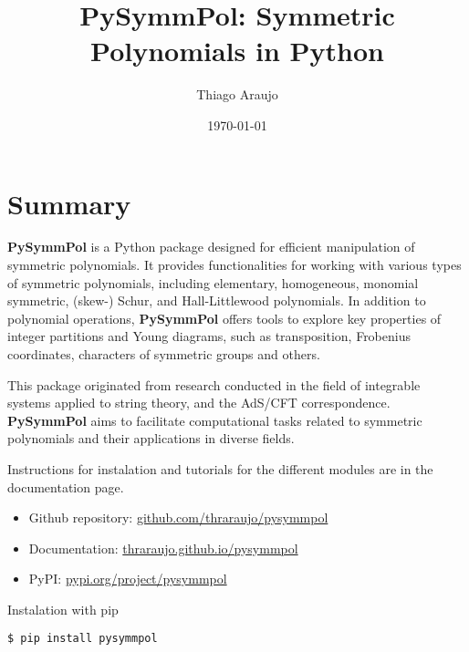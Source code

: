 \documentclass[a4paper,10pt]{amsart}
\begin{document}
\title[PySymmPol]{PySymmPol: Symmetric Polynomials in Python}

\author{Thiago Araujo}

\address{\noindent 
Institute for Theoretical Physics, UNESP-Universidade Estadual Paulista
R. Dr. Bento T. Ferraz 271, Bl. II, Sao Paulo 01140-070, SP, Brazil\\
and
Institute of Physics\\
Universidade de S\~ao Paulo\\ 
Rua do Matão Travessa 1371, 05508-090\\
São Paulo, SP. Brazil}


\date{\today}

\maketitle

\setcounter{tocdepth}{1}
\tableofcontents


\section{Summary}

\textbf{PySymmPol} is a Python package designed for efficient manipulation of
symmetric polynomials. It provides functionalities for working with
various types of symmetric polynomials, including elementary,
homogeneous, monomial symmetric, (skew-) Schur, and Hall-Littlewood
polynomials. In addition to polynomial operations, \textbf{PySymmPol} offers
tools to explore key properties of integer partitions and Young
diagrams, such as transposition, Frobenius coordinates, characters of
symmetric groups and others. 

This package originated from research conducted in the field of
integrable systems applied to string theory, and the AdS/CFT
correspondence. \textbf{PySymmPol} aims to facilitate computational tasks
related to symmetric polynomials and their applications in diverse
fields.

Instructions for instalation and tutorials for the different modules
are in the documentation page. 
\begin{itemize}
    \item Github repository: \href{https://github.com/thraraujo/pysymmpol}{github.com/thraraujo/pysymmpol}
    \item Documentation: \href{https://thraraujo.github.io/pysymmpol}{thraraujo.github.io/pysymmpol}
    \item PyPI: \href{https://pypi.org/project/pysymmpol}{pypi.org/project/pysymmpol}
\end{itemize}
Instalation with pip 
\begin{lstlisting}[language=Python]
  $ pip install pysymmpol
\end{lstlisting}
\end{document}

